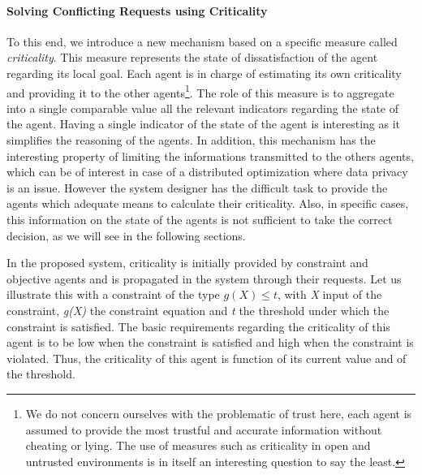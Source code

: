 \paragraph*{Solving Conflicting Requests using Criticality}
To this end, we introduce a new mechanism based on a specific measure called \emph{criticality}. This measure represents the state of dissatisfaction of the agent regarding its local goal. Each agent is in charge of estimating its own criticality and providing it to the other agents\footnote{We do not concern ourselves with the problematic of trust here, each agent is assumed to provide the most trustful and accurate information without cheating or lying. The use of measures such as criticality in open and untrusted environments is in itself an interesting question to say the least.}. The role of this measure is to aggregate into a single comparable value all the relevant indicators regarding the state of the agent. Having a single indicator of the state of the agent is interesting as it simplifies the reasoning of the agents. In addition, this mechanism has the interesting property of limiting the informations transmitted to the others agents, which can be of interest in case of a distributed optimization where data privacy is an issue.
However the system designer has the difficult task to provide the agents which adequate means to calculate their criticality. Also, in specific cases, this information on the state of the agents is not sufficient to take the correct decision, as we will see in the following sections.

In the proposed system, criticality is initially provided by constraint and objective agents and is propagated in the system through their requests.
Let us illustrate this with a constraint of the type \(g(X) \leq t\), with \emph{X} input of the constraint, \emph{g(X)} the constraint equation and \emph{t} the threshold under which the constraint is satisfied. The basic requirements regarding the criticality of this agent is to be low when the constraint is satisfied and high when the constraint is violated. Thus, the criticality of this agent is function of its current value and of the threshold.

